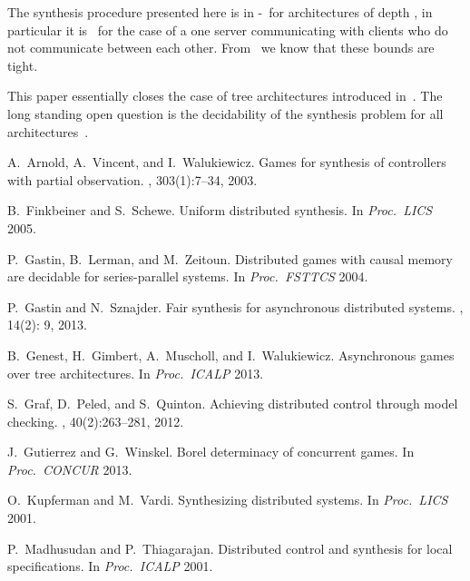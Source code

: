\documentclass[10pt,a4paper]{article}
\begin{document}
The synthesis procedure presented here is in -\EXPTIME\ for
architectures of depth 
, in particular it is \EXPTIME\ for the case of a one server
communicating with clients who do not communicate between each
other. From~\cite{GGMW13} we know that these bounds are tight.


This paper essentially closes the case of tree architectures
introduced in~\cite{GGMW13}. The long standing open question is the
decidability of the synthesis problem for all
architectures~\cite{GLZ04}. 













\begin{thebibliography}{10}

A.~Arnold, A.~Vincent, and I.~Walukiewicz.
\newblock Games for synthesis of controllers with partial observation.
, 303(1):7--34, 2003.

B.~Finkbeiner and S.~Schewe.
\newblock Uniform distributed synthesis.
\newblock In {\em Proc.~LICS} 2005.

P.~Gastin, B.~Lerman, and M.~Zeitoun.
\newblock Distributed games with causal memory are decidable for
  series-parallel systems.
\newblock In {\em Proc.~FSTTCS} 2004.

P.~Gastin and N.~Sznajder.
\newblock Fair synthesis for asynchronous distributed systems.
, 14(2): 9, 2013.

B.~Genest, H.~Gimbert, A.~Muscholl, and I.~Walukiewicz.
\newblock Asynchronous games over tree architectures.
\newblock In {\em Proc.~ICALP} 2013.

S.~Graf, D.~Peled, and S.~Quinton.
\newblock Achieving distributed control through model checking.
, 40(2):263--281, 2012.

J.~Gutierrez and G.~Winskel.
\newblock Borel determinacy of concurrent games.
\newblock In {\em Proc.~CONCUR} 2013.

O.~Kupferman and M.~Vardi.
\newblock Synthesizing distributed systems.
\newblock In {\em Proc.~LICS} 2001.

P.~Madhusudan and P.~Thiagarajan.
\newblock Distributed control and synthesis for local specifications.
\newblock In {\em Proc.~ICALP} 2001.


\end{thebibliography}
\end{document}
